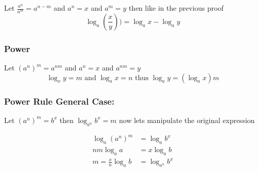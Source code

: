 Let \(\frac{a^n}{a^m} = a^{n - m}\) and \(a^n = x\) and \(a^m = y\) then like in the previous proof
\[
\log_a \left(\frac{x}{y}\right)) = \log_a x - \log_a y
\]
\QED 

\subsubsection{Power}

Let \((a^n)^m = a^{nm}\) and \(a^n = x\) and \(a^{nm} = y\)
\[
\log_x y = m \text{ and } \log_a x = n \text{ thus } \log_a y = (\log_a x )m
\]
\QED

\subsubsection{Power Rule General Case:}

Let \((a^n)^m = b^x\) then \(\log_{a^n} b^x = m\) now lets manipulate the original expression

\begin{align*}
\log_a (a^n)^m &= \log_a b^x\\
nm \log_a a &= x \log_a b\\
m = \frac{x}{n} \log_a b &=  \log_{a^n} b^x 
\end{align*}

\QED
\newpage
